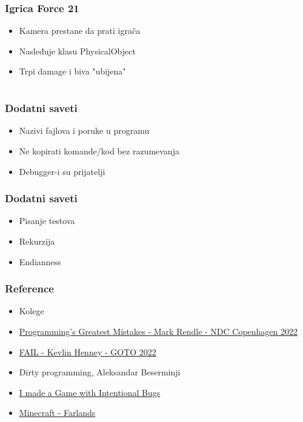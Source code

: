 \documentclass{beamer}
\begin{document}
\begin{frame}
    \frametitle{Igrica Force 21}
    \begin{itemize}
        \item Kamera prestane da prati igrača \newline
        \item Nasleđuje klasu PhysicalObject \newline
        \item Trpi damage i biva "ubijena"
    \end{itemize}
\end{frame}

\section*{}
\begin{frame}
    \frametitle{Dodatni saveti}
    \begin{itemize}
        \item Nazivi fajlova i poruke u programu \newline
        \item Ne kopirati komande/kod bez razumevanja \newline
        \item Debugger-i su prijatelji \smiley
    \end{itemize}
\end{frame}

\begin{frame}
    \frametitle{Dodatni saveti}
    \begin{itemize}
        \item Pisanje testova \newline
        \item Rekurzija \newline
        \item Endianness
    \end{itemize}
\end{frame}


\begin{frame}
    \frametitle{Reference}
    \begin{itemize}
        \item Kolege \smiley \newline
        \item \href{https://youtu.be/qC_ioJQpv4E}{Programming's Greatest Mistakes - Mark Rendle - NDC Copenhagen 2022} \newline
        \item \href{https://youtu.be/6xrGo1IIB3w}{FAIL - Kevlin Henney - GOTO 2022} \newline
        \item Dirty programming, Aleksandar Beserminji \newline
        \item \href{https://youtu.be/M_iiXaaF5T4}{I made a Game with Intentional Bugs} \newline
        \item \href{https://youtu.be/4f5M1fHxRrQ}{Minecraft - Farlands}
    \end{itemize}
    \end{frame}
\end{document}
